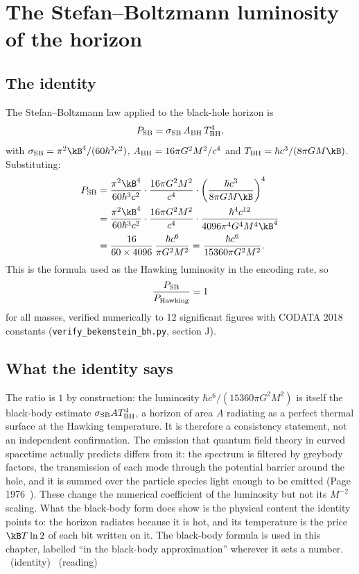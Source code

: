 \section{The Stefan--Boltzmann luminosity of the horizon}\label{sec:bh_sb}
\subsection{The identity}
The Stefan--Boltzmann law applied to the black-hole horizon is
\begin{equation}
P_{\rm SB}=\sigma_{\rm SB}\,A_{\rm BH}\,T_{\rm BH}^4,
\end{equation}
with $\sigma_{\rm SB}=\pi^2\kB^4/(60\hbar^3c^2)$, $A_{\rm BH}=16\pi G^2M^2/c^4$ and $T_{\rm BH}=\hbar c^3/(8\pi GM\kB)$. Substituting:
\begin{align}
P_{\rm SB}&=\frac{\pi^2\kB^4}{60\hbar^3c^2}\cdot\frac{16\pi G^2M^2}{c^4}\cdot\left(\frac{\hbar c^3}{8\pi GM\kB}\right)^4\notag\\
&=\frac{\pi^2\kB^4}{60\hbar^3c^2}\cdot\frac{16\pi G^2M^2}{c^4}\cdot\frac{\hbar^4c^{12}}{4096\pi^4G^4M^4\kB^4}\notag\\
&=\frac{16}{60\times4096}\,\frac{\hbar c^6}{\pi G^2M^2}=\frac{\hbar c^6}{15360\pi G^2M^2}.\label{eq:bh_PSB}
\end{align}
This is the formula used as the Hawking luminosity in the encoding rate, so
\begin{equation}
\frac{P_{\rm SB}}{P_{\rm Hawking}}=1
\end{equation}
for all masses, verified numerically to 12 significant figures with CODATA 2018 constants (\texttt{verify\_bekenstein\_bh.py}, section J). \derived

\subsection{What the identity says}
The ratio is $1$ by construction: the luminosity $\hbar c^6/(15360\pi G^2M^2)$ is itself the black-body estimate $\sigma_{\rm SB}AT_{\rm BH}^4$, a horizon of area $A$
radiating as a perfect thermal surface at the Hawking temperature. It is therefore a consistency statement, not an independent confirmation. The
emission that quantum field theory in curved spacetime actually predicts differs from it: the spectrum is filtered by greybody factors, the transmission
of each mode through the potential barrier around the hole, and it is summed over the particle species light enough to be emitted (Page 1976~\cite{Page1976}).
These change the numerical coefficient of the luminosity but not its $M^{-2}$ scaling. What the black-body form does show is the physical content the
identity points to: the horizon radiates because it is hot, and its temperature is the price $\kB T\ln2$ of each bit written on it. The black-body formula is
used in this chapter, labelled ``in the black-body approximation'' wherever it sets a number. \derived\ (identity) \interp\ (reading)

